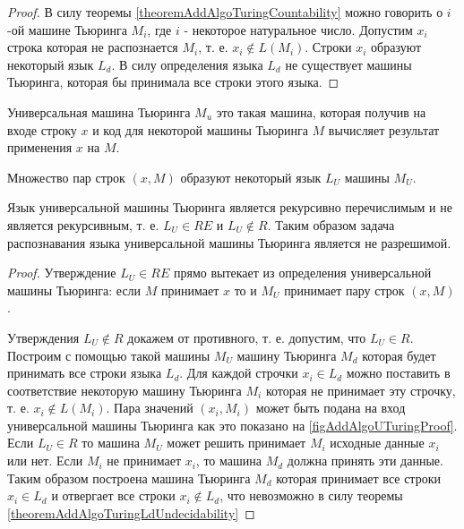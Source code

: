 \begin{proof}
В силу теоремы \ref{theoremAddAlgoTuringCountability} можно говорить о
$i$-ой машине Тьюринга $M_i$, где $i$ - некоторое натуральное
число. Допустим $x_i$ строка которая не распознается $M_i$, т. е. 
$x_i \notin L\left(M_i\right)$. Строки $x_i$ образуют некоторый язык
$L_d$. В силу определения языка $L_d$ не существует машины Тьюринга,
которая бы принимала все строки этого языка.
\end{proof}

\begin{definition}
Универсальная машина Тьюринга $M_u$ это такая машина, которая получив
на входе строку $x$ и код для некоторой машины Тьюринга $M$ вычисляет
результат применения $x$ на $M$.
\end{definition}



Множество пар строк $\left(x, M\right)$ образуют некоторый язык $L_U$ машины
$M_U$. 



\begin{theorem}

Язык универсальной машины Тьюринга является рекурсивно перечислимым и
не является рекурсивным, т. е. $L_U \in RE$ и $L_U \notin R$. Таким
образом задача распознавания языка универсальной машины Тьюринга
является не разрешимой.
\label{theoremAddAlgoTuringUniversalMachine}
\end{theorem}

\begin{proof}
Утверждение $L_U \in RE$ прямо вытекает из определения универсальной
машины Тьюринга: если $M$ принимает $x$ то и $M_U$ принимает пару
строк $\left(x, M\right)$.

Утверждения $L_U \notin R$ докажем от противного, т. е. допустим, что
$L_U \in R$. Построим с помощью такой машины $M_U$ машину Тьюринга
$M_d$ которая будет принимать все строки языка $L_d$. Для каждой строчки
$x_i \in L_d$ можно поставить в соответствие некоторую машину Тьюринга
$M_i$ которая не принимает эту строчку, т. е. $x_i \notin
L\left(M_i\right)$. Пара значений $\left(x_i, M_i\right)$ может быть
подана на вход универсальной машины Тьюринга как это показано на 
\autoref{figAddAlgoUTuringProof}. Если $L_U \in R$ то машина $M_U$ может
решить принимает $M_i$ исходные данные $x_i$ или нет. Если $M_i$ не
принимает $x_i$, то машина $M_d$ должна принять эти данные. Таким
образом построена машина Тьюринга $M_d$ которая принимает все строки
$x_i \in L_d$ и отвергает все строки $x_i \notin L_d$, что невозможно
в силу теоремы \ref{theoremAddAlgoTuringLdUndecidability}
\end{proof}

